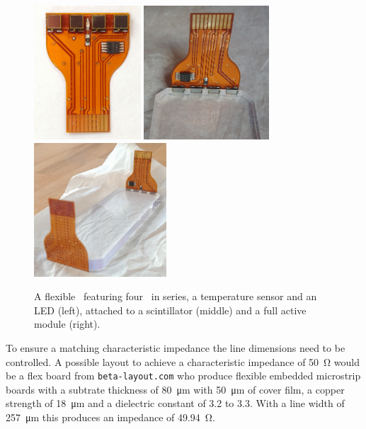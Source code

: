 \documentclass[../BTOF_summary.tex]{subfiles}
\begin{document}
\begin{figure}[htbp]
	\centering
	\includegraphics[height=5cm]{fig/SensorBoardNew2.png}
	\includegraphics[height=5cm]{fig/Sensorboards2Scintillator.jpg}
	\includegraphics[height=5cm]{fig/Sensorboards2Scintillator2.jpg}
	\caption[The flexible \sensorboard .]{A flexible \sensorboard\ featuring four \sipms\ in series, a temperature sensor and an LED (left), attached to a scintillator (middle) and a full active module (right).}
	\label{fig:SensorBoradNew}
\end{figure}

To ensure a matching characteristic impedance the line dimensions need to be controlled.
A possible layout to achieve a characteristic impedance of \SI{50}{\ohm} would be a flex board from \texttt{beta-layout.com} who produce flexible embedded microstrip boards with a subtrate thickness of \SI{80}{\micro m} with \SI{50}{\micro m} of cover film, a copper strength of \SI{18}{\micro m} and a dielectric constant of 3.2 to 3.3.
With a line width of \SI{257}{\micro m} this produces an impedance of \SI{49.94}{\ohm}.
\end{document}
